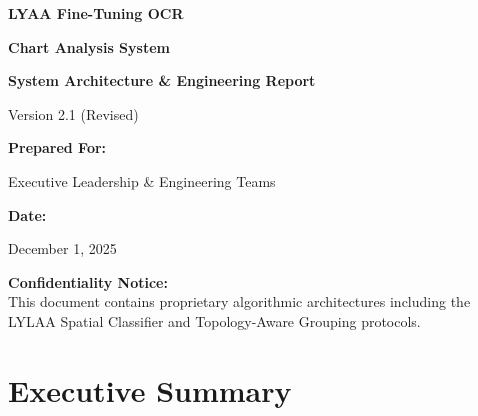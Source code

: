 \documentclass[11pt, a4paper]{report}
\begin{document}
\begin{titlepage}
    \centering
    \vspace*{2cm}
    
    {\Huge \textbf{LYAA Fine-Tuning OCR}} \par
    \vspace{0.5cm}
    {\Huge \textbf{Chart Analysis System}} \par
    \vspace{1.5cm}
    
    {\Large \textbf{System Architecture \& Engineering Report}} \par
    \vspace{0.5cm}
    {\large Version 2.1 (Revised)} \par
    
    \vspace{3cm}
    
    \textbf{Prepared For:} \par
    Executive Leadership \& Engineering Teams \par
    
    \vspace{1cm}
    
    \textbf{Date:} \par
    December 1, 2025
    
    \vfill
    
    \begin{tcolorbox}[colback=lyaaGray, colframe=lyaaBlue, width=0.8\textwidth, arc=2mm]
        \centering
        \textbf{Confidentiality Notice:} \\
        This document contains proprietary algorithmic architectures including the LYLAA Spatial Classifier and Topology-Aware Grouping protocols.
    \end{tcolorbox}
    
\end{titlepage}

\chapter*{Executive Summary}
\end{document}
